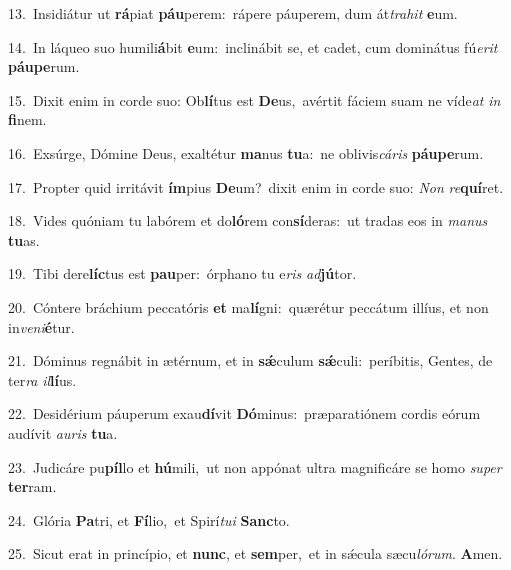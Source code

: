 {\numbfont\textcolor{\numbcolor}{13.}}~Insidiátur ut \textbf{rá}\-piat \textbf{páu}\-perem:~\star rápere páuperem, dum át\-\textit{tra}\-\textit{hit} \textbf{e}\-um.\par
{\numbfont\textcolor{\numbcolor}{14.}}~In láqueo suo humili\-\textbf{á}\-bit \textbf{e}\-um:~\star inclinábit se, et cadet, cum dominátus fú\-\textit{e}\-\textit{rit} \textbf{páu}\-\textbf{pe}rum.\par
{\numbfont\textcolor{\numbcolor}{15.}}~Dixit enim in corde suo: Ob\-\textbf{lí}\-tus est \textbf{De}\-us,~\star avértit fáciem suam ne víde\textit{at} \textit{in} \textbf{fi}\-nem.\par
{\numbfont\textcolor{\numbcolor}{16.}}~Exsúrge, Dómine Deus, exaltétur \textbf{ma}\-nus \textbf{tu}\-a:~\star ne oblivis\-\textit{cá}\-\textit{ris} \textbf{páu}\-\textbf{pe}rum.\par
{\numbfont\textcolor{\numbcolor}{17.}}~Propter quid irritávit \textbf{ím}\-pius \textbf{De}\-um?~\star dixit enim in corde suo: \textit{Non} \textit{re}\-\textbf{quí}ret.\par
{\numbfont\textcolor{\numbcolor}{18.}}~Vides quóniam tu labórem et do\-\textbf{ló}\-rem con\-\textbf{sí}\-deras:~\star ut tradas eos in \textit{ma}\-\textit{nus} \textbf{tu}\-as.\par
{\numbfont\textcolor{\numbcolor}{19.}}~Tibi dere\-\textbf{líc}\-tus est \textbf{pau}\-per:~\star órphano tu e\textit{ris} \textit{ad}\-\textbf{jú}tor.\par
{\numbfont\textcolor{\numbcolor}{20.}}~Cóntere bráchium peccatóris \textbf{et} ma\-\textbf{lí}\-gni:~\star quærétur peccátum illíus, et non in\-\textit{ve}\-\textit{ni}\textbf{é}tur.\par
{\numbfont\textcolor{\numbcolor}{21.}}~Dóminus regnábit in ætérnum, et in \textbf{sǽ}\-culum \textbf{sǽ}\-culi:~\star períbitis, Gentes, de ter\textit{ra} \textit{il}\-\textbf{lí}us.\par
{\numbfont\textcolor{\numbcolor}{22.}}~Desidérium páuperum exau\-\textbf{dí}\-vit \textbf{Dó}\-minus:~\star præparatiónem cordis eórum audívit \textit{au}\-\textit{ris} \textbf{tu}\-a.\par
{\numbfont\textcolor{\numbcolor}{23.}}~Judicáre pu\-\textbf{píl}\-lo et \textbf{hú}\-mili,~\star ut non appónat ultra magnificáre se homo \textit{su}\-\textit{per} \textbf{ter}\-ram.\par
{\numbfont\textcolor{\numbcolor}{24.}}~Glória \textbf{Pa}\-tri, et \textbf{Fí}\-lio,~\star et Spirí\-\textit{tu}\-\textit{i} \textbf{Sanc}\-to.\par
{\numbfont\textcolor{\numbcolor}{25.}}~Sicut erat in princípio, et \textbf{nunc}\-, et \textbf{sem}\-per,~\star et in sǽcula sæcu\-\textit{ló}\-\textit{rum}. \textbf{A}\-men.\par
